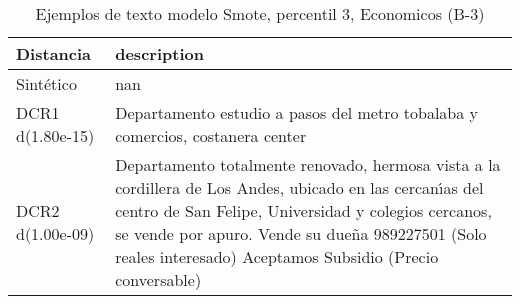 \begin{table}[H]
\centering
\fontsize{10}{14}\selectfont
\caption{Ejemplos de texto modelo Smote, percentil 3, Economicos (B-3)}
\label{table-example-economicos-b-3-smote-enc-3p-text}
\begin{tabular}{|l|m{35em}|}
\hline
\rowcolor[gray]{0.8}
Distancia & description \\
\hline Sintético & nan \\
\hline DCR1 d(1.80e-15) & Departamento estudio a pasos del metro tobalaba y comercios, costanera center \\
\hline DCR2 d(1.00e-09) & Departamento totalmente renovado, hermosa vista a la cordillera de Los Andes, ubicado en las cercan{\'\i}as del centro de San Felipe, Universidad y colegios cercanos, se vende por apuro.
Vende su due\~na 989227501 (Solo reales interesado) 
Aceptamos Subsidio (Precio conversable) \\
\hline
\end{tabular}
\end{table}
